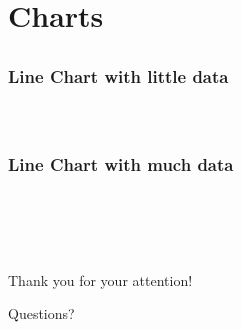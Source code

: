 \documentclass{beamer}
\begin{document}
\begin{frame}
\end{frame}

\section{Charts} 
\subsection*{}
\mdqoff
\begin{frame}\frametitle{Line Chart with little data}
	{ \centering 
	\\}
\end{frame}
\mdqon
{}



\subsection*{}
\begin{frame}\frametitle{Line Chart with much data}
	{\centering
	~%
	\\}
\end{frame}

\section*{}
\begin{frame}
\vspace{1.0cm}
	\begin{center}\\Thank you for your attention!\end{center}
\end{frame}

\begin{frame}
\vspace{1.0cm}
	\begin{center}Questions?\end{center}
\end{frame}
\end{document}
